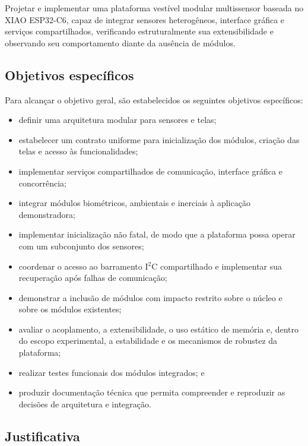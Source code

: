 \documentclass[a4paper,12pt]{article}
\begin{document}
Projetar e implementar uma plataforma vest\'ivel modular multissensor baseada no XIAO ESP32-C6, capaz de integrar sensores heterog\^eneos, interface gr\'afica e servi\c{c}os compartilhados, verificando estruturalmente sua extensibilidade e observando seu comportamento diante da aus\^encia de m\'odulos.

\subsection{Objetivos espec\'ificos}

Para alcan\c{c}ar o objetivo geral, s\~ao estabelecidos os seguintes objetivos espec\'ificos:

\begin{itemize}
    \item definir uma arquitetura modular para sensores e telas;
    \item estabelecer um contrato uniforme para inicializa\c{c}\~ao dos m\'odulos, cria\c{c}\~ao das telas e acesso \`as funcionalidades;
    \item implementar servi\c{c}os compartilhados de comunica\c{c}\~ao, interface gr\'afica e concorr\^encia;
    \item integrar m\'odulos biom\'etricos, ambientais e inerciais \`a aplica\c{c}\~ao demonstradora;
    \item implementar inicializa\c{c}\~ao n\~ao fatal, de modo que a plataforma possa operar com um subconjunto dos sensores;
    \item coordenar o acesso ao barramento I$^2$C compartilhado e implementar sua recupera\c{c}\~ao ap\'os falhas de comunica\c{c}\~ao;
    \item demonstrar a inclus\~ao de m\'odulos com impacto restrito sobre o n\'ucleo e sobre os m\'odulos existentes;
    \item avaliar o acoplamento, a extensibilidade, o uso est\'atico de mem\'oria e, dentro do escopo experimental, a estabilidade e os mecanismos de robustez da plataforma;
    \item realizar testes funcionais dos m\'odulos integrados; e
    \item produzir documenta\c{c}\~ao t\'ecnica que permita compreender e reproduzir as decis\~oes de arquitetura e integra\c{c}\~ao.
\end{itemize}

\subsection{Justificativa}
\end{document}
